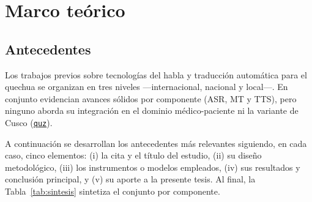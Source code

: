 \documentclass[12pt,a4paper]{article}
\newcommand{\obsdos}[1]{\textcolor{verdeOK}{#1}}
\DeclareRobustCommand{\sig}[1]{\hyperlink{sig:#1}{\texttt{#1}}}
\begin{document}
\clearpage
\section{Marco te{\'o}rico}

\subsection{Antecedentes}
Los trabajos previos sobre tecnolog{\'i}as del habla y traducci{\'o}n autom{\'a}tica para el quechua
se organizan en tres niveles ---internacional, nacional y local---. En conjunto evidencian avances
s{\'o}lidos por componente (ASR, MT y TTS), pero ninguno aborda su integraci{\'o}n en el dominio
m{\'e}dico-paciente ni la variante de Cusco (\sig{quz}).

\obsdos{A continuaci{\'o}n se desarrollan los antecedentes m{\'a}s relevantes siguiendo, en cada caso,
cinco elementos: (i) la cita y el t{\'i}tulo del estudio, (ii) su dise{\~n}o metodol{\'o}gico, (iii)
los instrumentos o modelos empleados, (iv) sus resultados y conclusi{\'o}n principal, y (v) su aporte
a la presente tesis. Al final, la Tabla~\ref{tab:sintesis} sintetiza el conjunto por componente.}
\end{document}
